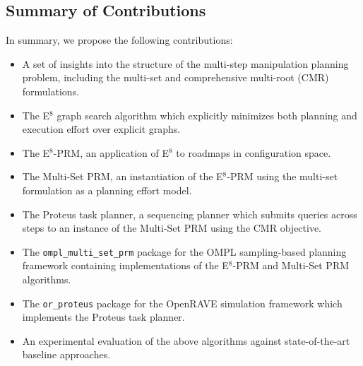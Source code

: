 \subsection*{Summary of Contributions}

In summary,
we propose the following contributions:
\begin{itemize}
\item A set of insights into the structure of the
   multi-step manipulation planning problem,
   including the multi-set and comprehensive multi-root (CMR)
   formulations.
\item The E$^8$ graph search algorithm which explicitly minimizes
   both planning and execution effort over explicit graphs.
\item The E$^8$-PRM, an application of E$^8$ to roadmaps in
   configuration space.
\item The Multi-Set PRM, an instantiation of the E$^8$-PRM
   using the multi-set formulation as a planning effort model.
\item The {\sc Proteus} task planner,
   a sequencing planner which submits queries across steps
   to an instance of the Multi-Set PRM using the CMR objective.
\item The {\tt ompl\_multi\_set\_prm} package
   for the OMPL\cite{sucan2012ompl} sampling-based planning framework
   containing implementations of the E$^8$-PRM and Multi-Set PRM
   algorithms.
\item The {\tt or\_proteus} package for the
   OpenRAVE\cite{diankov2010openrave} simulation framework
   which implements the {\sc Proteus} task planner.
\item An experimental evaluation of the above algorithms against
   state-of-the-art baseline approaches.
\end{itemize}

